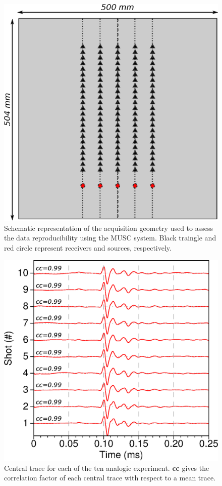 \documentclass[manuscript,revised]{geophysics}
\begin{document}
\begin{figure}[!h]
	\centering
	\includegraphics[scale=0.5]{fig/reproducibility_acqui_principle.eps}
	\caption{Schematic representation of the acquisition geometry used to assess the data reproducibility using the MUSC system. Black traingle and red circle represent receivers and sources, respectively.}
	\label{reproducibility_acqui_principle}
\end{figure}

\begin{figure}[!h]
	\centering
	\includegraphics[scale=0.5]{fig/musc_F50_CT.eps}
	\caption{Central trace for each of the ten analogic experiment. \textbf{cc} gives the correlation factor of each central trace with respect to a mean trace.}
	\label{panel_central_traces_cc}
\end{figure}
\end{document}
